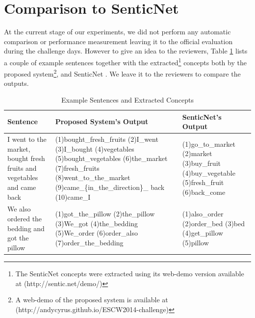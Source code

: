\documentclass[runningheads,a4paper]{llncs}
\begin{document}
\section{Comparison to SenticNet}
At the current stage of our experiments, we did not perform any automatic comparison or performance measurement leaving it to the official evaluation during the challenge days. However to give an idea to the reviewers, Table \ref{tab:sen-conc-compare} lists a couple of example sentences together with the extracted\footnote{The SenticNet concepts were extracted using its web-demo version available at (http://sentic.net/demo/)} concepts both by the proposed system\footnote{A web-demo of the proposed system is available at (http://andycyrus.github.io/ESCW2014-challenge)}, and SenticNet \cite{senticnet}. We leave it to the reviewers to compare the outputs. 
\begin{table}[!h]
\centering
\begin{tabular}{>{\raggedright}p{3cm}>{\raggedright}p{5.5cm}p{3.5cm}<{\raggedright}}
\hline \textbf{Sentence} & \textbf{Proposed System's Output}  & \textbf{SenticNet's Output} \\ 
\hline I went to the market, bought fresh fruits and vegetables and came back &(1)bought\_fresh\_fruits (2)I\_went (3)I\_bought (4)vegetables (5)bought\_vegetables (6)the\_market (7)fresh\_fruits (8)went\_to\_the\_market  (9)came\_\{in\_the\_direction\}\_ back  (10)came\_I &(1)go\_to\_market (2)market (3)buy\_fruit (4)buy\_vegetable (5)fresh\_fruit (6)back\_come\\ 
\hline We also ordered the bedding and got the pillow & (1)got\_the\_pillow (2)the\_pillow (3)We\_got (4)the\_bedding (5)We\_order (6)order\_also (7)order\_the\_bedding & (1)also\_order (2)order\_bed (3)bed (4)get\_pillow (5)pillow \\ 
\hline 
\end{tabular}  
\caption{Example Sentences and Extracted Concepts}
\label{tab:sen-conc-compare}
\end{table}

\end{document}
